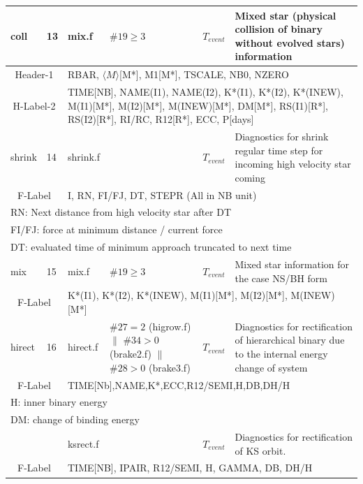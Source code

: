 \begin{longtable}{||p{0.42in}|p{0.25in}|p{0.6in}|p{0.6in}|p{0.4in}|p{2.3in}||}
    coll   & 13  & mix.f      & $\#19\geq3$  & $T_{event}$    & Mixed star (physical collision of binary without evolved stars) information     \\\hline
\multicolumn{2}{|c|}{ Header-1 } & \multicolumn{4}{|p{4.4in}|}{ RBAR, $\langle M\rangle$[M*], M1[M*], TSCALE, NB0, NZERO }\\\hline
\multicolumn{2}{|c|}{ H-Label-2} & \multicolumn{4}{|p{4.4in}|}{ TIME[NB], NAME(I1), NAME(I2), K*(I1), K*(I2), K*(INEW), M(I1)[M*], M(I2)[M*], M(INEW)[M*], DM[M*], RS(I1)[R*], RS(I2)[R*], RI/RC, R12[R*], ECC, P[days] }\\\hline


    shrink  & 14  & shrink.f   &         & $T_{event}$    & Diagnostics for shrink regular time step for incoming high velocity star coming \\\hline
\multicolumn{2}{|c|}{ F-Label } & \multicolumn{4}{|p{4.4in}|}{ I, RN, FI/FJ, DT, STEPR (All in NB unit) }\\\hline
\multicolumn{6}{|p{5.4in}|}{ RN: Next distance from high velocity star after DT }\\
\multicolumn{6}{|p{5.4in}|}{ FI/FJ: force at minimum distance / current force }\\
\multicolumn{6}{|p{5.4in}|}{ DT: evaluated time of minimum approach truncated to next time }\\\hline\hline

    mix   & 15  & mix.f      & $\#19\geq3$  & $T_{event}$    & Mixed star information for the case NS/BH form \\\hline
\multicolumn{2}{|c|}{ F-Label } & \multicolumn{4}{|p{4.4in}|}{ K*(I1), K*(I2), K*(INEW), M(I1)[M*], M(I2)[M*], M(INEW)[M*] }\\\hline\hline

    hirect  & 16  & hirect.f   & $\#27=2$ (higrow.f) $\|$ $\#34>0$ (brake2.f) $\|$ $\#28>0$ (brake3.f) & $T_{event}$  & Diagnostics for rectification of hierarchical binary due to the internal energy change of system \\\hline
\multicolumn{2}{|c|}{ F-Label } & \multicolumn{4}{|p{4.4in}|}{ TIME[Nb],NAME,K*,ECC,R12/SEMI,H,DB,DH/H }\\\hline
\multicolumn{6}{|p{5.4in}|}{ H: inner binary energy }\\
\multicolumn{6}{|p{5.4in}|}{ DM: change of binding energy }\\\hline
           &     & ksrect.f   &         & $T_{event}$    & Diagnostics for rectification of KS orbit. \\\hline
\multicolumn{2}{|c|}{ F-Label } & \multicolumn{4}{|p{4.4in}|}{ TIME[NB], IPAIR, R12/SEMI, H, GAMMA, DB, DH/H }\\\hline\hline


\end{longtable}
